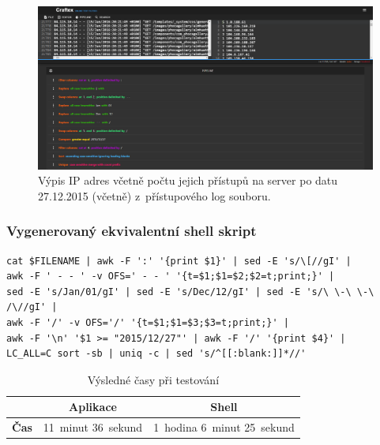 \begin{figure}[hbt]
	\centering
	\setlength{\fboxsep}{0pt}
	\includegraphics[width=1\textwidth]{obrazky-figures/testovaci_ukol.PNG}
	\caption{Výpis IP adres včetně počtu jejich přístupů na server po datu 27.12.2015 (včetně) z~přístupového log souboru.}
	\label{obr:Filtrace3}
\end{figure}

\subsubsection*{Vygenerovaný ekvivalentní shell skript}
\begin{verbatim}
cat $FILENAME | awk -F ':' '{print $1}' | sed -E 's/\[//gI' | 
awk -F ' - - ' -v OFS=' - - ' '{t=$1;$1=$2;$2=t;print;}' | 
sed -E 's/Jan/01/gI' | sed -E 's/Dec/12/gI' | sed -E 's/\ \-\ \-\ /\//gI' | 
awk -F '/' -v OFS='/' '{t=$1;$1=$3;$3=t;print;}' | 
awk -F '\n' '$1 >= "2015/12/27"' | awk -F '/' '{print $4}' | 
LC_ALL=C sort -sb | uniq -c | sed 's/^[[:blank:]]*//'
\end{verbatim}

\begin{table}[H]
    \centering
    \caption{Výsledné časy při testování}
    \label{tab:Výsledné časy při testování}
    \begin{tabular}{|c|c|c|}
        \hline
         & \textbf{Aplikace} & \textbf{Shell}  \\ \hline
        \textbf{Čas} & 11~minut 36~sekund & 1~hodina 6~minut 25~sekund \\ \hline
    \end{tabular}
\end{table}

